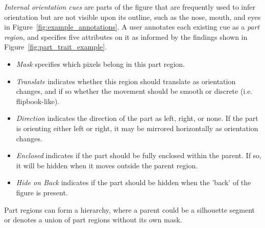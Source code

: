 \textit{Internal orientation cues} are parts of the figure that are frequently used to infer orientation but are not visible upon its outline, such as the nose, mouth, and eyes in Figure~\ref{fig:example_annotations}. A user annotates each existing cue as a \textit{part region}, and specifies five attributes on it as informed by the findings shown in Figure~\ref{fig:part_trait_example}.
\begin{itemize}
\item \textit{Mask} specifies which pixels belong in this part region.
\item \textit{Translate} indicates whether this region should translate as orientation changes, and if so whether the movement should be smooth or discrete (i.e. flipbook-like). 
\item \textit{Direction} indicates the direction of the part as left, right, or none. If the part is orienting either left or right, it may be mirrored horizontally as orientation changes. 
\item \textit{Enclosed} indicates if the part should be fully enclosed within the parent. If so, it will be hidden when it moves outside the parent region.
\item \textit{Hide on Back} indicates if the part should be hidden when the 'back' of the figure is present. 
\end{itemize}
Part regions can form a hierarchy, where a parent could be a silhouette segment or denotes a union of part regions without its own mask. %
\begin{comment}
A user does this by specifying \textit{part regions} upon the character.
A part region is a set of pixels that ought to be modified similarly as the character changes orientation.
Informed by the findings shown in Figure~\ref{fig:part_trait_example}, each \textit{part} has five attributes.
First, it has a segmentation mask, specifying which pixels of the original image it contains.
Second, it has a boolean attribute indicating whether this part ought to translate as orientation changes.
There is also an optional smoothness parameter indicating whether translation should be smooth or discrete (i.e. flipbook-like)
Third, it has a boolean attribute indicating whether it should be flipped horizontally as orientation changes.
If so, the orientation of the part, as drawn, is also provided.
Fourth, it has a boolean attribute indicating whether part's pixels should be hidden if they move beyond the pixels belonging to its parent.
Fifth, it has a boolean attribute indicating whether, when the 'back' of the character is present, the part should be hidden entirely.
Each part may be parented to another part, or to the figure mask directly. 
\end{comment}


